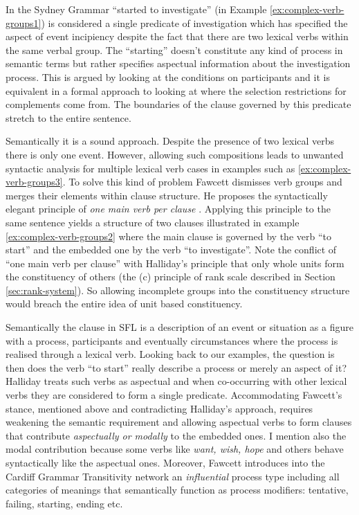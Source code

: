 In the Sydney Grammar ``started to investigate'' (in Example \ref{ex:complex-verb-groups1}) is considered a single predicate of investigation which has specified the aspect of event incipiency despite the fact that there are two lexical verbs within the same verbal group. The ``starting'' doesn't constitute any kind of process in semantic terms but rather specifies aspectual information about the investigation process. This is argued by looking at the conditions on participants and it is equivalent in a formal approach to looking at where the selection restrictions for complements come from. The boundaries of the clause governed by this predicate stretch to the entire sentence.

Semantically it is a sound approach. Despite the presence of two lexical verbs there is only one event. However, allowing such compositions leads to unwanted syntactic analysis for multiple lexical verb cases in examples such as \ref{ex:complex-verb-groups3}. To solve this kind of problem Fawcett dismisses verb groups and merges their elements within clause structure. He proposes the syntactically elegant principle of \textit{one main verb per clause} \citep{Fawcett2008}. Applying this principle to the same sentence yields a structure of two clauses illustrated in example \ref{ex:complex-verb-groups2} where the main clause is governed by the verb ``to start'' and the embedded one by the verb ``to investigate''. Note the conflict of ``one main verb per clause'' with Halliday's principle that only whole units form the constituency of others (the (c) principle of rank scale described in Section \ref{sec:rank-system}). So allowing incomplete groups into the constituency structure would breach the entire idea of unit based constituency. 

Semantically the clause in SFL is a description of an event or situation as a figure with a process, participants and eventually circumstances where the process is realised through a lexical verb. Looking back to our examples, the question is then does the verb ``to start'' really describe a process or merely an aspect of it? Halliday treats such verbs as aspectual and when co-occurring with other lexical verbs they are considered to form a single predicate. Accommodating Fawcett's stance, mentioned above and contradicting Halliday's approach, requires weakening the semantic requirement and allowing aspectual verbs to form clauses that contribute \textit{aspectually or modally} to the embedded ones. I mention also the modal contribution because some verbs like \textit{want, wish, hope} and others behave syntactically like the aspectual ones. Moreover, Fawcett introduces into the Cardiff Grammar Transitivity network an \textit{influential} process type including all categories of meanings that semantically function as process modifiers: tentative, failing, starting, ending etc.

